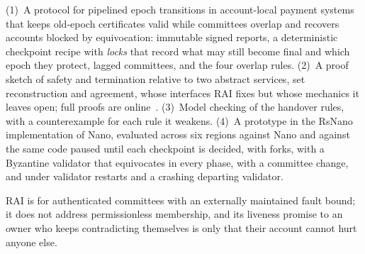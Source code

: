 (1)~A protocol for pipelined epoch transitions in account-local payment systems that keeps old-epoch certificates valid while committees overlap and recovers accounts blocked by equivocation: immutable signed reports, a deterministic checkpoint recipe with \emph{locks} that record what may still become final and which epoch they protect, lagged committees, and the four overlap rules. (2)~A proof sketch of safety and termination relative to two abstract services, set reconstruction and agreement, whose interfaces RAI fixes but whose mechanics it leaves open; full proofs are online~\cite{extended}. (3)~Model checking of the handover rules, with a counterexample for each rule it weakens. (4)~A prototype in the RsNano implementation of Nano, evaluated across six regions against Nano and against the same code paused until each checkpoint is decided, with forks, with a Byzantine validator that equivocates in every phase, with a committee change, and under validator restarts and a crashing departing validator.

RAI is for authenticated committees with an externally maintained fault bound; it does not address permissionless membership, and its liveness promise to an owner who keeps contradicting themselves is only that their account cannot hurt anyone else.
